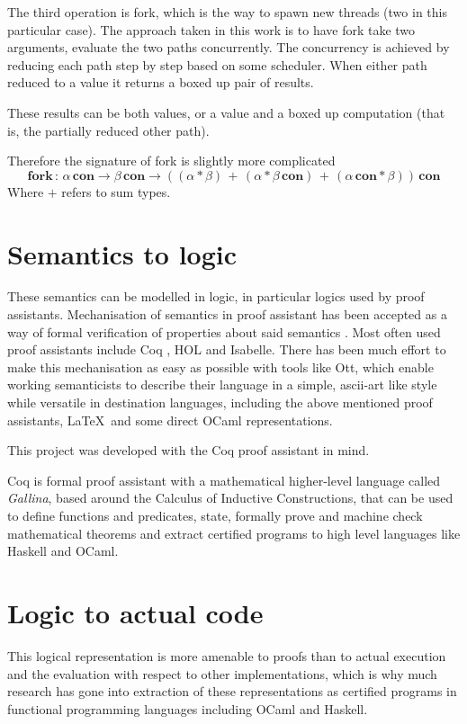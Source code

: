 \documentclass[12pt,twoside,notitlepage]{report}
\begin{document}
The third operation is fork, which is the way to spawn new threads (two in this particular case). The approach taken in this work is to have fork take two arguments, evaluate the two paths concurrently. The concurrency is achieved by reducing each path step by step based on some scheduler. When either path reduced to a value it returns a boxed up pair of results. 

These results can be both values, or a value and a boxed up computation (that is, the partially reduced other path).

Therefore the signature of fork is slightly more complicated
\[ \textbf{fork} \, : \, \alpha \, \textbf{con} \rightarrow \beta \, \textbf{con} \rightarrow ((\alpha * \beta ) \, + \, (\alpha *  \beta \, \textbf{con}) \, + \, ( \alpha \, \textbf{con} * \beta) ) \, \textbf{con} \]
Where $ + $ refers to sum types.  

\section{Semantics to logic}
These semantics can be modelled in logic, in particular logics used by proof assistants. Mechanisation of semantics in proof assistant has been accepted as a way of formal verification of properties about said semantics \cite{benton2008mechanized,blazy2009mechanized, blazy2006formal, leroy2009formal}. Most often used proof assistants include Coq \cite{Coq}, HOL and Isabelle. There has been much effort to make this mechanisation as easy as possible with tools like Ott\cite{Ott}, which enable working semanticists to describe their language in a simple, ascii-art like style while versatile in destination languages, including the above mentioned proof assistants, \LaTeX \, and some direct OCaml representations.

This project was developed with the Coq proof assistant in mind. 

Coq is formal proof assistant with a mathematical higher-level language called \textit{Gallina}, based around the Calculus of Inductive Constructions, that can be used to define functions and predicates, state, formally prove and machine check mathematical theorems and extract certified programs to high level languages like Haskell and OCaml.


\section{Logic to actual code}
This logical representation is more amenable to proofs than to actual execution and the evaluation with respect to other implementations, which is why much research has gone into extraction of these representations as certified programs in functional programming languages including OCaml \cite{letouzey2008extraction} and Haskell.
\end{document}
